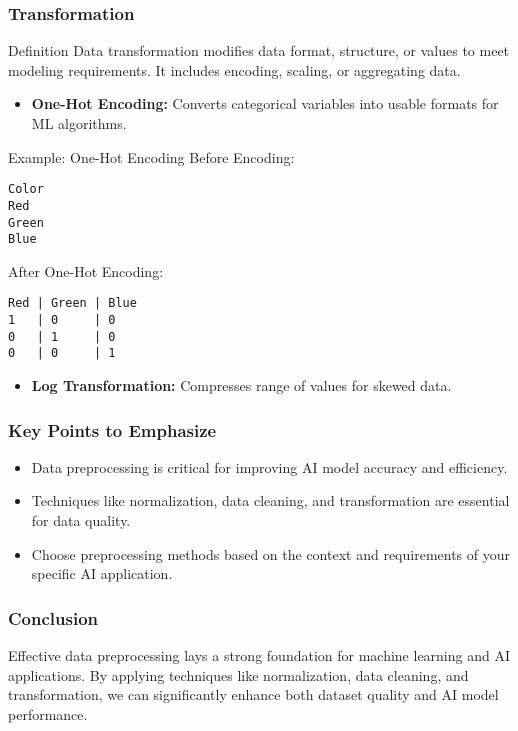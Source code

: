 \documentclass[aspectratio=169]{beamer}
\begin{document}
\begin{frame}[fragile]
    \frametitle{Transformation}
    \begin{block}{Definition}
        Data transformation modifies data format, structure, or values to meet modeling requirements. It includes encoding, scaling, or aggregating data.
    \end{block}

    \begin{itemize}
        \item \textbf{One-Hot Encoding:} Converts categorical variables into usable formats for ML algorithms.
    \end{itemize}

    \begin{exampleblock}{Example: One-Hot Encoding}
        Before Encoding:
        \begin{verbatim}
Color
Red
Green
Blue
        \end{verbatim}
        After One-Hot Encoding:
        \begin{verbatim}
Red | Green | Blue
1   | 0     | 0
0   | 1     | 0
0   | 0     | 1
        \end{verbatim}
    \end{exampleblock}

    \begin{itemize}
        \item \textbf{Log Transformation:} Compresses range of values for skewed data.
    \end{itemize}
\end{frame}

\begin{frame}
    \frametitle{Key Points to Emphasize}
    \begin{itemize}
        \item Data preprocessing is critical for improving AI model accuracy and efficiency.
        \item Techniques like normalization, data cleaning, and transformation are essential for data quality.
        \item Choose preprocessing methods based on the context and requirements of your specific AI application.
    \end{itemize}
\end{frame}

\begin{frame}
    \frametitle{Conclusion}
    Effective data preprocessing lays a strong foundation for machine learning and AI applications. By applying techniques like normalization, data cleaning, and transformation, we can significantly enhance both dataset quality and AI model performance.
\end{frame}
\end{document}
